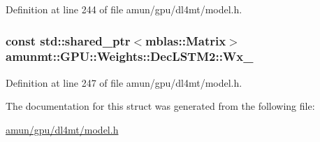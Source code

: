 Definition at line 244 of file amun/gpu/dl4mt/model.\+h.

\subsubsection[{\texorpdfstring{Wx\+\_\+}{Wx_}}]{\setlength{\rightskip}{0pt plus 5cm}const std\+::shared\+\_\+ptr$<${\bf mblas\+::\+Matrix}$>$ amunmt\+::\+G\+P\+U\+::\+Weights\+::\+Dec\+L\+S\+T\+M2\+::\+Wx\+\_\+}\hypertarget{structamunmt_1_1GPU_1_1Weights_1_1DecLSTM2_ab0f487eb7f751eee86cd47bca625bd26}{}\label{structamunmt_1_1GPU_1_1Weights_1_1DecLSTM2_ab0f487eb7f751eee86cd47bca625bd26}


Definition at line 247 of file amun/gpu/dl4mt/model.\+h.



The documentation for this struct was generated from the following file\+:\begin{DoxyCompactItemize}
\item 
\hyperlink{amun_2gpu_2dl4mt_2model_8h}{amun/gpu/dl4mt/model.\+h}\end{DoxyCompactItemize}
